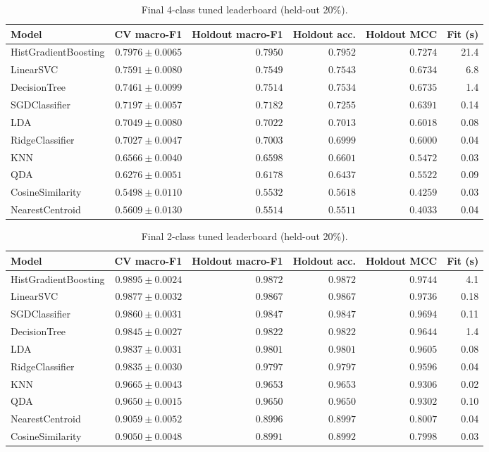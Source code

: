 \documentclass[11pt,a4paper]{article}
\begin{document}
\begin{table}[H]
\centering
\caption{Final 4-class tuned leaderboard (held-out 20\%).}
\label{tab:tuned-4class}
\small
\begin{tabular}{lrrrrr}
\toprule
Model & CV macro-F1 & Holdout macro-F1 & Holdout acc. & Holdout MCC & Fit (s) \\
\midrule
HistGradientBoosting & $0.7976\pm0.0065$ & $\mathbf{0.7950}$ & $0.7952$ & $0.7274$ & 21.4 \\
LinearSVC & $0.7591\pm0.0080$ & $0.7549$ & $0.7543$ & $0.6734$ & 6.8 \\
DecisionTree & $0.7461\pm0.0099$ & $0.7514$ & $0.7534$ & $0.6735$ & 1.4 \\
SGDClassifier & $0.7197\pm0.0057$ & $0.7182$ & $0.7255$ & $0.6391$ & 0.14 \\
LDA & $0.7049\pm0.0080$ & $0.7022$ & $0.7013$ & $0.6018$ & 0.08 \\
RidgeClassifier & $0.7027\pm0.0047$ & $0.7003$ & $0.6999$ & $0.6000$ & 0.04 \\
KNN & $0.6566\pm0.0040$ & $0.6598$ & $0.6601$ & $0.5472$ & 0.03 \\
QDA & $0.6276\pm0.0051$ & $0.6178$ & $0.6437$ & $0.5522$ & 0.09 \\
CosineSimilarity & $0.5498\pm0.0110$ & $0.5532$ & $0.5618$ & $0.4259$ & 0.03 \\
NearestCentroid & $0.5609\pm0.0130$ & $0.5514$ & $0.5511$ & $0.4033$ & 0.04 \\
\bottomrule
\end{tabular}
\end{table}

\begin{table}[H]
\centering
\caption{Final 2-class tuned leaderboard (held-out 20\%).}
\label{tab:tuned-2class}
\small
\begin{tabular}{lrrrrr}
\toprule
Model & CV macro-F1 & Holdout macro-F1 & Holdout acc. & Holdout MCC & Fit (s) \\
\midrule
HistGradientBoosting & $0.9895\pm0.0024$ & $\mathbf{0.9872}$ & $0.9872$ & $0.9744$ & 4.1 \\
LinearSVC & $0.9877\pm0.0032$ & $0.9867$ & $0.9867$ & $0.9736$ & 0.18 \\
SGDClassifier & $0.9860\pm0.0031$ & $0.9847$ & $0.9847$ & $0.9694$ & 0.11 \\
DecisionTree & $0.9845\pm0.0027$ & $0.9822$ & $0.9822$ & $0.9644$ & 1.4 \\
LDA & $0.9837\pm0.0031$ & $0.9801$ & $0.9801$ & $0.9605$ & 0.08 \\
RidgeClassifier & $0.9835\pm0.0030$ & $0.9797$ & $0.9797$ & $0.9596$ & 0.04 \\
KNN & $0.9665\pm0.0043$ & $0.9653$ & $0.9653$ & $0.9306$ & 0.02 \\
QDA & $0.9650\pm0.0015$ & $0.9650$ & $0.9650$ & $0.9302$ & 0.10 \\
NearestCentroid & $0.9059\pm0.0052$ & $0.8996$ & $0.8997$ & $0.8007$ & 0.04 \\
CosineSimilarity & $0.9050\pm0.0048$ & $0.8991$ & $0.8992$ & $0.7998$ & 0.03 \\
\bottomrule
\end{tabular}
\end{table}
\end{document}
